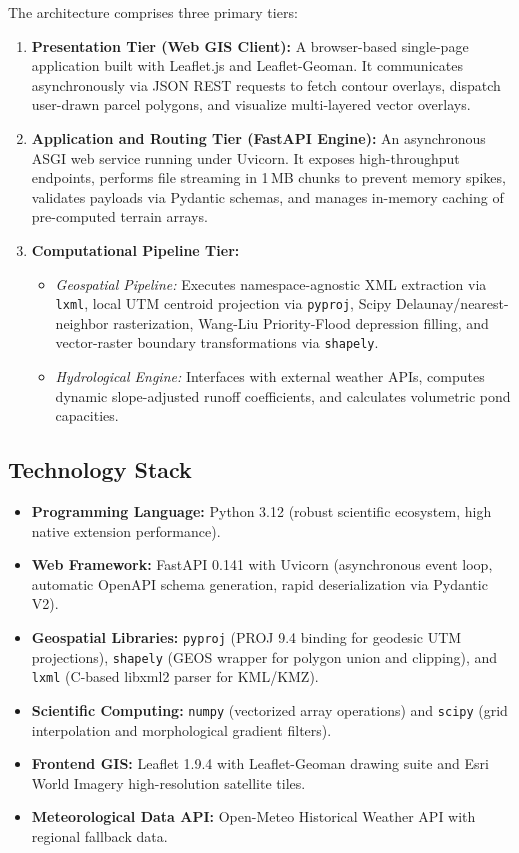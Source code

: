 \documentclass[manuscript,screen,review]{acmart}
\begin{document}
The architecture comprises three primary tiers:
\begin{enumerate}
    \item \textbf{Presentation Tier (Web GIS Client):} A browser-based single-page application built with Leaflet.js and Leaflet-Geoman. It communicates asynchronously via JSON REST requests to fetch contour overlays, dispatch user-drawn parcel polygons, and visualize multi-layered vector overlays.
    \item \textbf{Application and Routing Tier (FastAPI Engine):} An asynchronous ASGI web service running under Uvicorn. It exposes high-throughput endpoints, performs file streaming in 1\,MB chunks to prevent memory spikes, validates payloads via Pydantic schemas, and manages in-memory caching of pre-computed terrain arrays.
    \item \textbf{Computational Pipeline Tier:}
    \begin{itemize}
        \item \emph{Geospatial Pipeline:} Executes namespace-agnostic XML extraction via \texttt{lxml}, local UTM centroid projection via \texttt{pyproj}, Scipy Delaunay/nearest-neighbor rasterization, Wang-Liu Priority-Flood depression filling, and vector-raster boundary transformations via \texttt{shapely}.
        \item \emph{Hydrological Engine:} Interfaces with external weather APIs, computes dynamic slope-adjusted runoff coefficients, and calculates volumetric pond capacities.
    \end{itemize}
\end{enumerate}

\subsection{Technology Stack}
\begin{itemize}
    \item \textbf{Programming Language:} Python 3.12 (robust scientific ecosystem, high native extension performance).
    \item \textbf{Web Framework:} FastAPI 0.141 with Uvicorn (asynchronous event loop, automatic OpenAPI schema generation, rapid deserialization via Pydantic V2).
    \item \textbf{Geospatial Libraries:} \texttt{pyproj} (PROJ 9.4 binding for geodesic UTM projections), \texttt{shapely} (GEOS wrapper for polygon union and clipping), and \texttt{lxml} (C-based libxml2 parser for KML/KMZ).
    \item \textbf{Scientific Computing:} \texttt{numpy} (vectorized array operations) and \texttt{scipy} (grid interpolation and morphological gradient filters).
    \item \textbf{Frontend GIS:} Leaflet 1.9.4 with Leaflet-Geoman drawing suite and Esri World Imagery high-resolution satellite tiles.
    \item \textbf{Meteorological Data API:} Open-Meteo Historical Weather API with regional fallback data.
\end{itemize}
\end{document}
